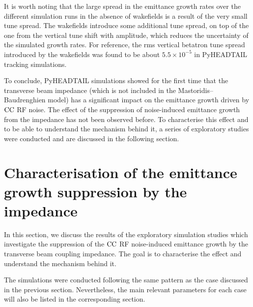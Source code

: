 It is worth noting that the large spread in the emittance growth rates over the different simulation runs in the absence of wakefields is a result of the very small tune spread. The wakefields introduce some additional tune spread, on top of the one from the vertical tune shift with amplitude, which reduces the uncertainty of the simulated growth rates. For reference, the rms vertical betatron tune spread introduced by the wakefields was found to be about $5.5 \times 10^{-5}$ in PyHEADTAIL tracking simulations.

To conclude, PyHEADTAIL simulations showed for the first time that the transverse beam impedance (which is not included in the Mastoridis--Baudrenghien model) has a significant impact on the emittance growth driven by ${\mathrm{CC}}$ RF noise. The effect of the suppression of noise-induced emittance growth from the impedance has not been observed before. 
To characterise this effect and to be able to understand the mechanism behind it, a series of exploratory studies were conducted and are discussed in the following section. 


\section{Characterisation of the emittance growth suppression by the impedance}\label{sec:emittance_growth_exploratory_studies}

In this section, we discuss the results of the exploratory simulation studies which investigate the suppression of the ${\mathrm{CC}}$ RF noise-induced emittance growth by the transverse beam coupling impedance. The goal is to characterise the effect and understand the mechanism behind it. 

The simulations were conducted following the same pattern as the case discussed in the previous section. Nevertheless, the main relevant parameters for each case will also be listed in the corresponding section.

